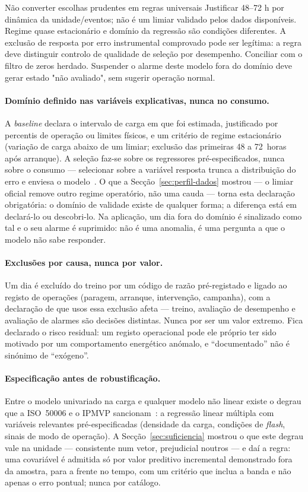 {Não converter escolhas prudentes em regras universais}
{Justificar 48--72 h por dinâmica da unidade/eventos; não é um limiar
validado pelos dados disponíveis. Regime quase estacionário e domínio
da regressão são condições diferentes. A exclusão de resposta por erro
instrumental comprovado pode ser legítima: a regra deve distinguir
controlo de qualidade de seleção por desempenho. Conciliar com o filtro
de zeros herdado. Suspender o alarme deste modelo fora do domínio deve
gerar estado "não avaliado", sem sugerir operação normal.}%
\paragraph{Domínio definido nas variáveis explicativas, nunca no consumo.} A
\emph{baseline} declara o intervalo de carga em que foi estimada, justificado
por percentis de operação ou limites físicos, e um critério de regime
estacionário (variação de carga abaixo de um limiar; exclusão das primeiras
48 a 72~horas após arranque). A seleção faz-se sobre os regressores
pré-especificados, nunca sobre o consumo --- selecionar sobre a variável
resposta trunca a distribuição do erro e enviesa o modelo~\cite{Heckman1979}. O que a
Secção~\ref{sec:perfil-dados} mostrou --- o limiar oficial remove outro
regime operatório, não uma cauda --- torna esta declaração obrigatória: o
domínio de validade existe de qualquer forma; a diferença está em declará-lo
ou descobri-lo. Na aplicação, um dia fora do domínio é sinalizado como tal
e o seu alarme é suprimido: não é uma anomalia, é uma pergunta a que o
modelo não sabe responder.

\paragraph{Exclusões por causa, nunca por valor.} Um dia é excluído do treino
por um código de razão pré-registado e ligado ao registo de operações
(paragem, arranque, intervenção, campanha), com a declaração de que usos
essa exclusão afeta --- treino, avaliação de desempenho e avaliação de
alarmes são decisões distintas. Nunca por ser um valor extremo. Fica
declarado o risco residual: um registo operacional pode ele próprio ter sido
motivado por um comportamento energético anómalo, e ``documentado'' não é
sinónimo de ``exógeno''.

\paragraph{Especificação antes de robustificação.} Entre o modelo univariado
na carga e qualquer modelo não linear existe o degrau que a ISO~50006 e o
IPMVP sancionam~\cite{ISO50006_2014,IPMVP_2022}: a regressão linear múltipla com variáveis relevantes
pré-especificadas (densidade da carga, condições de \emph{flash}, sinais de
modo de operação). A Secção~\ref{sec:suficiencia} mostrou o que este degrau
vale na unidade --- consistente num vetor, prejudicial noutros --- e daí a
regra: uma covariável é admitida só por valor preditivo incremental
demonstrado fora da amostra, para a frente no tempo, com um critério que
inclua a banda e não apenas o erro pontual; nunca por catálogo.

